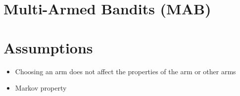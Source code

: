 \section{Multi-Armed Bandits (MAB)}

\section{Assumptions}

\begin{itemize}
    \item Choosing an arm does not affect the properties of the arm or other arms
    \item Markov property
\end{itemize}
